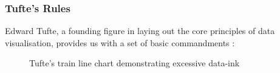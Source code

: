 \documentclass[a4paper,11pt,titlepage]{article}
\begin{document}

\subsubsection{Tufte's Rules}
		\par 
		Edward Tufte, a founding figure in laying out the core principles of data visualisation, provides us with a set of basic commandments \cite{Tufte2001}:		

		\begin{figure}[H]
    			\centering	
    			\qquad
    			\caption{Tufte's train line chart demonstrating excessive data-ink}%
		\end{figure}
\end{document}

